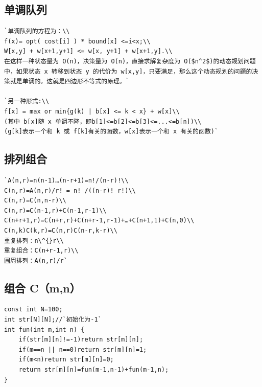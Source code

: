 \documentclass[a4paper]{article}
\begin{document}
\begin{CJK*}{UTF8}{gbsn}
\begin{multicols}{3}
\begin{flushleft}
\subsection{单调队列}
\begin{lstlisting}
`单调队列的方程为：\\
f(x)= opt( cost[i] ) * bound[x] <=i<x;\\
W[x,y] + w[x+1,y+1] <= w[x, y+1] + w[x+1,y].\\
在这样一种状态量为 O(n)，决策量为 O(n)，直接求解复杂度为 O($n^2$)的动态规划问题中，如果状态 x 转移到状态 y 的代价为 w[x,y]，只要满足，那么这个动态规划的问题的决策就是单调的。这就是四边形不等式的原理。`

`另一种形式:\\
f[x] = max or min{g(k) | b[x] <= k < x} + w[x]\\
(其中 b[x]随 x 单调不降，即b[1]<=b[2]<=b[3]<=...<=b[n])\\
(g[k]表示一个和 k 或 f[k]有关的函数，w[x]表示一个和 x 有关的函数)`
\end{lstlisting}

\subsection{排列组合}
\begin{lstlisting}
`A(n,r)=n(n-1)…(n-r+1)=n!/(n-r)!\\
C(n,r)=A(n,r)/r! = n! /((n-r)! r!)\\
C(n,r)=C(n,n-r)\\
C(n,r)=C(n-1,r)+C(n-1,r-1)\\
C(n+r+1,r)=C(n+r,r)+C(n+r-1,r-1)+…+C(n+1,1)+C(n,0)\\
C(n,k)C(k,r)=C(n,r)C(n-r,k-r)\\
重复排列：n\^{}r\\
重复组合：C(n+r-1,r)\\
圆周排列：A(n,r)/r`
\end{lstlisting}


\subsection{组合 C（m,n）}
\begin{lstlisting}
const int N=100;
int str[N][N];//`初始化为-1`
int fun(int m,int n) {
    if(str[m][n]!=-1)return str[m][n];
    if(m==n || n==0)return str[m][n]=1;
    if(m<n)return str[m][n]=0;
    return str[m][n]=fun(m-1,n-1)+fun(m-1,n);
}
\end{lstlisting}


\end{flushleft}
\end{multicols}
\end{CJK*}
\end{document}

